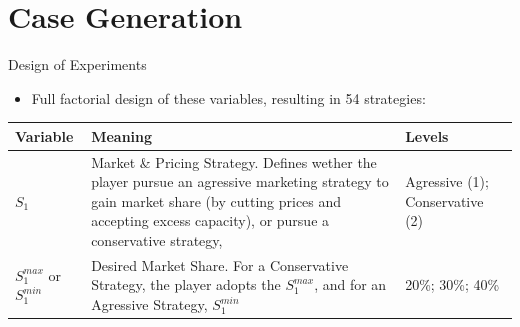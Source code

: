 \documentclass[12pt,ignorenonframetext,]{beamer}
\providecommand{\tightlist}{%
  \setlength{\itemsep}{0pt}\setlength{\parskip}{0pt}}
\begin{document}
\section{Case Generation}\label{case-generation}

\begin{frame}{Design of Experiments}

\begin{itemize}
\tightlist
\item
  Full factorial design of these variables, resulting in 54 strategies:
\end{itemize}

\begin{longtable}[]{@{}lll@{}}
\toprule
\begin{minipage}[b]{0.14\columnwidth}\raggedright\strut
Variable\strut
\end{minipage} & \begin{minipage}[b]{0.47\columnwidth}\raggedright\strut
Meaning\strut
\end{minipage} & \begin{minipage}[b]{0.30\columnwidth}\raggedright\strut
Levels\strut
\end{minipage}\tabularnewline
\midrule
\endhead
\begin{minipage}[t]{0.14\columnwidth}\raggedright\strut
\(S_1\)\strut
\end{minipage} & \begin{minipage}[t]{0.47\columnwidth}\raggedright\strut
Market \& Pricing Strategy. Defines wether the player pursue an
agressive marketing strategy to gain market share (by cutting prices and
accepting excess capacity), or pursue a conservative strategy,\strut
\end{minipage} & \begin{minipage}[t]{0.30\columnwidth}\raggedright\strut
Agressive (1); Conservative (2)\strut
\end{minipage}\tabularnewline
\begin{minipage}[t]{0.14\columnwidth}\raggedright\strut
\(S_1^{max}\) or \(S_1^{min}\)\strut
\end{minipage} & \begin{minipage}[t]{0.47\columnwidth}\raggedright\strut
Desired Market Share. For a Conservative Strategy, the player adopts the
\(S_1^{max}\), and for an Agressive Strategy, \(S_1^{min}\)\strut
\end{minipage} & \begin{minipage}[t]{0.30\columnwidth}\raggedright\strut
20\%; 30\%; 40\%\strut
\end{minipage}\tabularnewline

\end{longtable}
\end{frame}
\end{document}
